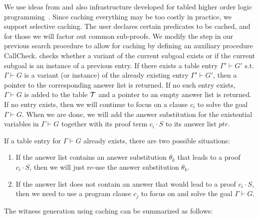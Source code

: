 \documentclass{llncs}
\newcommand{\vd}{\vdash}
\begin{document}
We use ideas from and also infrastructure developed for tabled higher
order logic programming~\cite{Pientka03phd,Pientka:ICLP02}.  Since
caching everything may be too costly in practice, we support selective
caching. The user declares certain predicates to be cached, and for
those we will factor out common sub-proofs. We modify the
{} step in our previous search procedure to allow for
caching by defining an auxiliary procedure {\sf
CallCheck}. {\sf{CallCheck($\Gamma \vd G, \cal{T}$)}} checks whether a
variant of the current subgoal exists or if the current subgoal is an
instance of a previous entry. If there exists a table entry $\Gamma'
\vd G'$ s.t. $\Gamma \vd G$ is a variant (or instance) of the already
existing entry $\Gamma' \vd G'$, then a pointer to the corresponding
answer list is returned. If no such entry exists, $\Gamma \vd G$ is
added to the table $\cal{T}$ and a pointer to an empty answer list is
returned. If no entry exists, then we will continue to focus on a
clause $c_i$ to solve the goal $\Gamma \vd G$. When we are done, we
will add the answer substitution for the existential variables in
$\Gamma \vd G$ together with its proof term $c_i \cdot S$ to its
answer list $ptr$.

If a table entry for $\Gamma \vd G$ already exists, there are two
possible situations: 
\begin{enumerate}
\item If the answer list contains an answer
substitution $\theta_k$ that leads to a proof $c_i \cdot S$,
then we will just re-use the answer substitution $\theta_k$. 
\item If the
answer list does not contain an answer that would lead to a proof
$c_i \cdot S$, then we need to use a program clause $c_j$ to focus on
and solve the goal $\Gamma \vd G$. 
\end{enumerate}
The witness generation using
caching can be summarized as follows:
\end{document}

